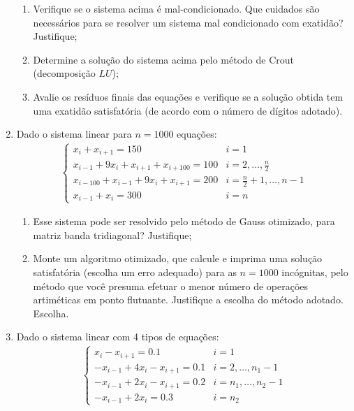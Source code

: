 \documentclass[12pt]{article}
\newenvironment{smallitem}{
    \vspace{-2mm}
    \begin{enumerate}
    \setlength{\parskip}{0pt}
    \setlength{\itemsep}{2pt}
}{
    \vspace{-2mm}
    \end{enumerate}
}
\begin{document}
\begin{enumerate}[label=\textbf{\arabic*})]
\begin{smallitem}

\item Verifique se o sistema acima é mal-condicionado. Que cuidados são
necessários para se resolver um sistema mal condicionado com exatidão?
Justifique;

\item Determine a solução do sistema acima pelo método de Crout (decomposição
$LU$);

\item Avalie os resíduos finais das equações e verifique se a solução obtida
tem uma exatidão satisfatória (de acordo com o número de dígitos adotado).

\end{smallitem}

\item Dado o sistema linear para $n = 1000$ equações:
\begin{align*}
\begin{cases}
x_i + x_{i + 1} = 150 & i = 1 \\
x_{i - 1} + 9x_i + x_{i + 1} + x_{i + 100} = 100 &
i = 2, \dots, \frac{n}{2} \\
x_{i - 100} + x_{i - 1} + 9x_i + x_{i + 1} = 200 &
i = \frac{n}{2} + 1, \dots, n - 1 \\
x_{i - 1} + x_i = 300 & i = n
\end{cases}
\end{align*}

\begin{smallitem}

\item Esse sistema pode ser resolvido pelo método de Gauss otimizado, para
matriz banda tridiagonal? Justifique;

\item Monte um algoritmo otimizado, que calcule e imprima uma solução
satisfatória (escolha um erro adequado) para as $n = 1000$ incógnitas, pelo
método que você presuma efetuar o menor número de operações artiméticas em
ponto flutuante. Justifique a escolha do método adotado. Escolha.

\end{smallitem}

\item Dado o sistema linear com 4 tipos de equações:
\begin{align*}
\begin{cases}
x_i - x_{i + 1} = 0.1 & i = 1 \\
- x_{i - 1} + 4x_i - x_{i + 1} = 0.1 & i = 2, \dots, n_1 - 1 \\
- x_{i - 1} + 2x_i - x_{i + 1} = 0.2 & i = n_1, \dots, n_2 - 1 \\
- x_{i - 1} + 2x_i = 0.3 & i = n_2
\end{cases}
\end{align*}


\end{enumerate}
\end{document}
